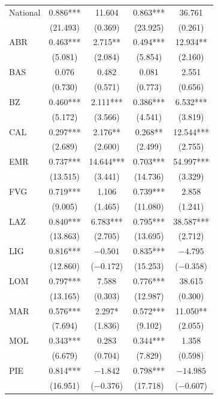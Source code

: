 \documentclass[12pt]{article}
\begin{document}
\begin{appendices}
\begin{longtable}{@{}lcccc@{}}
            National & 0.886*** & 11.604 & 0.863*** & 36.761 \\ 
             & (21.493) & (0.369) & (23.925) & (0.261) \\ 
            ABR & 0.463*** & 2.715** & 0.494*** & 12.934** \\ 
             & (5.081) & (2.084) & (5.854) & (2.160) \\ 
            BAS & 0.076 & 0.482 & 0.081 & 2.551 \\ 
             & (0.730) & (0.571) & (0.773) & (0.656) \\ 
            BZ & 0.460*** & 2.111*** & 0.386*** & 6.532*** \\ 
             & (5.172) & (3.566) & (4.541) & (3.819) \\ 
            CAL & 0.297*** & 2.176** & 0.268** & 12.544*** \\ 
             & (2.689) & (2.600) & (2.499) & (2.755) \\ 
            EMR & 0.737*** & 14.644*** & 0.703*** & 54.997*** \\ 
             & (13.515) & (3.441) & (14.736) & (3.329) \\ 
            FVG & 0.719*** & 1.106 & 0.739*** & 2.858 \\ 
             & (9.005) & (1.465) & (11.080) & (1.241) \\ 
            LAZ & 0.840*** & 6.783*** & 0.795*** & 38.587*** \\ 
             & (13.863) & (2.705) & (13.695) & (2.712) \\ 
            LIG & 0.816*** & $-0.501$ & 0.835*** & $-4.795$ \\ 
             & (12.860) & ($-0.172$) & (15.253) & ($-0.358$) \\ 
            LOM & 0.797*** & 7.588 & 0.776*** & 38.615 \\ 
             & (13.165) & (0.303) & (12.987) & (0.300) \\ 
            MAR & 0.576*** & 2.297* & 0.572*** & 11.050** \\ 
             & (7.694) & (1.836) & (9.102) & (2.055) \\ 
            MOL & 0.343*** & 0.283 & 0.344*** & 1.358 \\ 
             & (6.679) & (0.704) & (7.829) & (0.598) \\ 
            PIE & 0.814*** & $-1.842$ & 0.798*** & $-14.985$ \\ 
             & (16.951) & ($-0.376$) & (17.718) & ($-0.607$) \\ 

\end{longtable}
\end{appendices}
\end{document}
